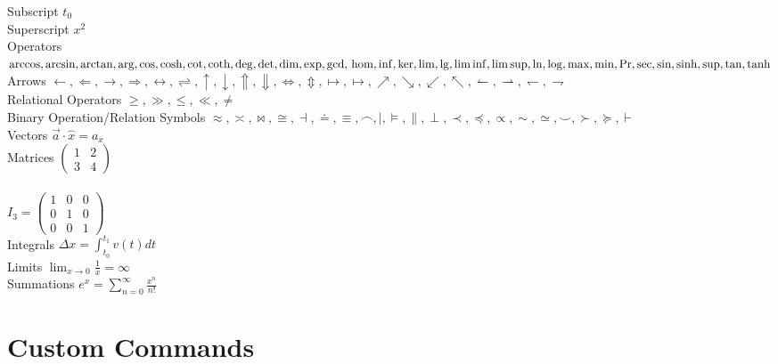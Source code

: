 \documentclass[a4paper,12pt,]{report}
\begin{document}
Subscript $t_0$ \\

Superscript $x^2$ \\

Operators $\arccos, \arcsin, \arctan, \arg, \cos, \cosh, \cot, \coth, \deg, \det, \dim, \exp, \gcd,\\ \hom, \inf, \ker, \lim, \lg, \liminf, \limsup, \ln, \log,
\max, \min, \Pr, \sec, \sin, \sinh, \sup, \tan, \tanh$ \\

Arrows $\leftarrow, \Leftarrow, \rightarrow, \Rightarrow, \leftrightarrow, \rightleftharpoons, \uparrow, \downarrow, \Uparrow, \Downarrow,
\Leftrightarrow, \Updownarrow, \mapsto, \longmapsto, \nearrow, \searrow, \swarrow, \nwarrow, \leftharpoonup, \rightharpoonup,
\leftharpoondown, \rightharpoondown$ \\

Relational Operators $ \geq, \gg, \leq, \ll, \neq $ \\

Binary Operation/Relation Symbols $ \approx, \asymp, \bowtie, \cong, \dashv, \doteq, \equiv, \frown, \mid, \models, \parallel, \perp, \prec, \preceq,
\propto, \sim, \simeq, \smile, \succ, \succeq, \vdash $ \\

Vectors $\vec{a}\cdot\hat{x}=a_x$ \\

Matrices
$\begin{pmatrix}
1 & 2 \\
3 & 4
\end{pmatrix}$\\
\\
$I_3 =
\begin{pmatrix}
1 & 0 & 0 \\
0 & 1 & 0 \\
0 & 0 & 1
\end{pmatrix}$ \\

Integrals $\Delta x=\int_{t_0}^{t_1}v(t)dt$ \\

Limits $\lim_{x\to0} \frac 1 x = \infty$ \\

Summations $e^x=\sum_{n=0}^\infty\frac{x^n}{n!}$ \\


\section{\textsf{Custom Commands}}
\end{document}
